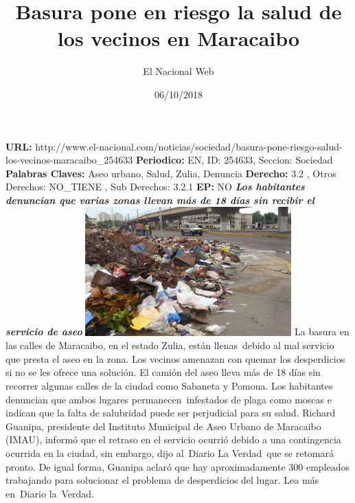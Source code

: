 \documentclass{article}%
\title{\textbf{Basura pone en riesgo la salud de los vecinos en Maracaibo}}%
\author{El Nacional Web}%
\date{06/10/2018}%
\begin{document}
%
\normalsize%
\maketitle%
\textbf{URL: }%
http://www.el{-}nacional.com/noticias/sociedad/basura{-}pone{-}riesgo{-}salud{-}los{-}vecinos{-}maracaibo\_254633\newline%
%
\textbf{Periodico: }%
EN, %
ID: %
254633, %
Seccion: %
Sociedad\newline%
%
\textbf{Palabras Claves: }%
Aseo urbano, Salud, Zulia, Denuncia\newline%
%
\textbf{Derecho: }%
3.2%
, Otros Derechos: %
NO\_TIENE%
, Sub Derechos: %
3.2.1%
\newline%
%
\textbf{EP: }%
NO\newline%
\newline%
%
\textbf{\textit{Los habitantes denuncian que varias zonas llevan más de 18 días sin recibir el servicio de aseo}}%
\newline%
\newline%
%
\includegraphics[width=300px]{117.jpg}%
\newline%
%
La basura en las calles de Maracaibo, en el estado Zulia, están llenas~debido al mal servicio que presta el aseo en la zona. Los vecinos amenazan con quemar los desperdicios si no se les ofrece una solución.%
\newline%
%
El camión del aseo lleva más de 18 días sin recorrer algunas calles de la ciudad como Sabaneta y Pomona. Los habitantes denuncian que ambos lugares permanecen~infestados de plaga como moscas e indican que la falta de salubridad puede ser perjudicial para su salud.%
\newline%
%
Richard Guanipa, presidente del Instituto Municipal de Aseo Urbano de Maracaibo (IMAU), informó que el retraso en el servicio ocurrió debido a una contingencia ocurrida en la ciudad, sin embargo, dijo al~Diario La Verdad~que se retomará pronto.%
\newline%
%
De igual forma, Guanipa aclaró que hay aproximadamente 300 empleados trabajando para solucionar el problema de desperdicios del lugar.%
\newline%
%
Lea más en~Diario la~Verdad.%
\newline%
%
\end{document}

